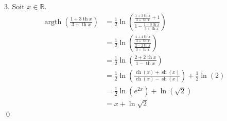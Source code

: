 \documentclass[10pt]{article}
\DeclareMathOperator{\ch}{ch}
\DeclareMathOperator{\sh}{sh}
\DeclareMathOperator{\tah}{th}
\DeclareMathOperator{\argth}{argth}
\begin{document}
\begin{tcolorbox}[enhanced, width=7in, center, size=fbox, fontupper=\large, drop shadow southwest]
    3. Soit $x\in\mathbb{R}$.
    \begin{align*}
        \argth\left(\frac{1+3\tah x}{3+\tah x}\right)&=\frac{1}{2}\ln\left(\frac{\frac{1+3\tah x}{3+\tah x}+1}{1-\frac{1+3\tah x}{3+\tah x}}\right)\\
        &=\frac{1}{2}\ln\left(\frac{\frac{4+4\tah x}{3+\tah x}}{\frac{2-2\tah x}{3 + \tah x}}\right)\\
        &=\frac{1}{2}\ln\left(\frac{2+2\tah x}{1-\tah x}\right)\\
        &=\frac{1}{2}\ln\left(\frac{\ch(x)+\sh(x)}{\ch(x)-\sh(x)}\right)+\frac{1}{2}\ln(2)\\
        &=\frac{1}{2}\ln\left(e^{2x}\right)+\ln(\sqrt{2})\\
        &=x+\ln\sqrt{2}
    \end{align*}
    \qed
\end{tcolorbox}

\end{document}
